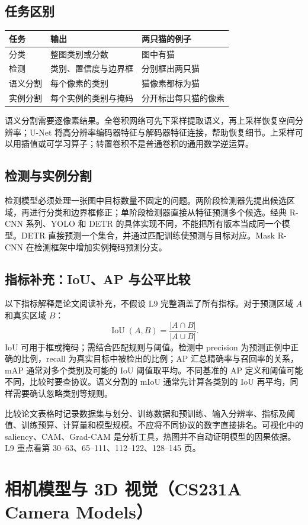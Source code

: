 \documentclass[11pt,a4paper,fontset=none]{ctexart}
\begin{document}
\subsection{任务区别}
\begin{center}\small\begin{tabular}{p{.22\linewidth}p{.35\linewidth}p{.34\linewidth}}\toprule
任务 & 输出 & 两只猫的例子\\\midrule
分类 & 整图类别或分数 & 图中有猫\\
检测 & 类别、置信度与边界框 & 分别框出两只猫\\
语义分割 & 每个像素的类别 & 猫像素都标为猫\\
实例分割 & 每个实例的类别与掩码 & 分开标出每只猫的像素\\\bottomrule\end{tabular}\end{center}
语义分割需要逐像素结果。全卷积网络可先下采样提取语义，再上采样恢复空间分辨率；U-Net 将高分辨率编码器特征与解码器特征连接，帮助恢复细节。上采样可以用插值或可学习算子；转置卷积不是普通卷积的通用数学逆运算。
\subsection{检测与实例分割}
检测模型必须处理一张图中目标数量不固定的问题。两阶段检测器先提出候选区域，再进行分类和边界框修正；单阶段检测器直接从特征预测多个候选。经典 R-CNN 系列、YOLO 和 DETR 的具体实现不同，不能把所有版本当成同一个模型。DETR 直接预测一个集合，并通过匹配训练使预测与目标对应。Mask R-CNN 在检测框架中增加实例掩码预测分支。
\subsection{指标补充：IoU、AP 与公平比较}
以下指标解释是论文阅读补充，不假设 L9 完整涵盖了所有指标。对于预测区域 $A$ 和真实区域 $B$：
\[
\operatorname{IoU}(A,B)=\frac{|A\cap B|}{|A\cup B|}.
\]
IoU 可用于框或掩码；需结合匹配规则与阈值。检测中 precision 为预测正例中正确的比例，recall 为真实目标中被检出的比例；AP 汇总精确率与召回率的关系，mAP 通常对多个类别及可能的 IoU 阈值取平均。不同基准的 AP 定义和阈值可能不同，比较时要查协议。语义分割的 mIoU 通常先计算各类别的 IoU 再平均，同样需要确认忽略类别等规则。

比较论文表格时记录数据集与划分、训练数据和预训练、输入分辨率、指标及阈值、训练预算、计算量和模型规模。不应将不同协议的数字直接排名。可视化中的 saliency、CAM、Grad-CAM 是分析工具，热图并不自动证明模型的因果依据。L9 重点看第 30--63、65--111、112--122、128--145 页。
\section{相机模型与 3D 视觉（CS231A Camera Models）}
\end{document}
